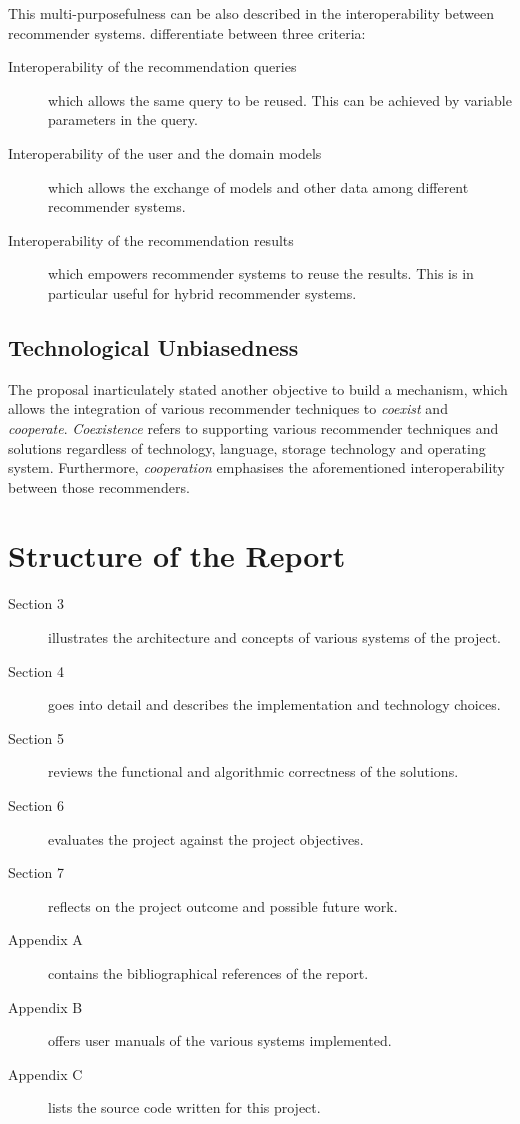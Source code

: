 This multi-purposefulness can be also described in the interoperability between recommender systems. \citet{manouselis07} differentiate between three criteria:

\begin{description}
    \item[Interoperability of the recommendation queries] which allows the same query to be reused. This can be achieved by variable parameters in the query.
    \item[Interoperability of the user and the domain models] which allows the exchange of models and other data among different recommender systems.
    \item[Interoperability of the recommendation results] which empowers recommender systems to reuse the results. This is in particular useful for hybrid recommender systems.
\end{description}

\subsection{Technological Unbiasedness}

The proposal inarticulately stated another objective to build a mechanism, which allows the integration of various recommender techniques to \emph{coexist} and \emph{cooperate}. \emph{Coexistence} refers to supporting various recommender techniques and solutions regardless of technology, language, storage technology and operating system. Furthermore, \emph{cooperation} emphasises the aforementioned interoperability between those recommenders.

\section{Structure of the Report}

\begin{description}
    \item[Section 3] illustrates the architecture and concepts of various systems of the project.
    \item[Section 4] goes into detail and describes the implementation and technology choices.
    \item[Section 5] reviews the functional and algorithmic correctness of the solutions.
    \item[Section 6] evaluates the project against the project objectives.
    \item[Section 7] reflects on the project outcome and possible future work.
    \item[Appendix A] contains the bibliographical references of the report.
    \item[Appendix B] offers user manuals of the various systems implemented.
    \item[Appendix C] lists the source code written for this project.
\end{description}